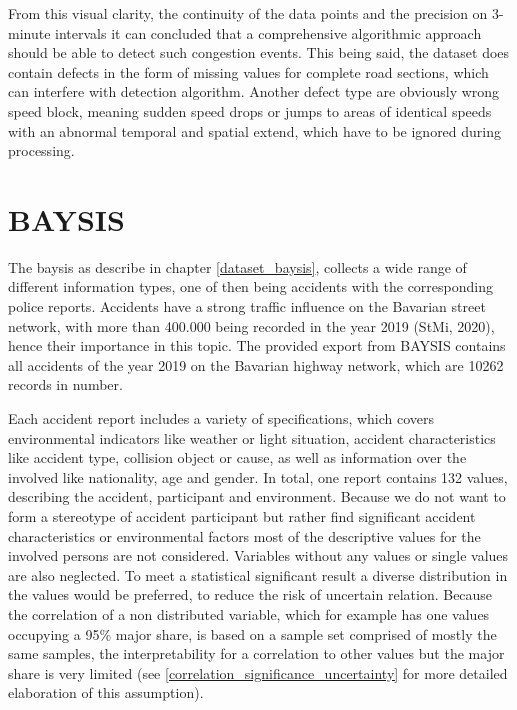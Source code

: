 From this visual clarity, the continuity of the data points and the precision on 3-minute intervals it can concluded that a comprehensive algorithmic approach should be able to detect such congestion events. This being said, the dataset does contain defects in the form of missing values for complete road sections, which can interfere with detection algorithm. Another defect type are obviously wrong speed block, meaning sudden speed drops or jumps to areas of identical speeds with an abnormal temporal and spatial extend, which have to be ignored during processing. 

\section{BAYSIS}
\label{dataset_baysis}

The \acrfull{baysis} as describe in chapter \autoref{dataset_baysis}, collects a wide range of different information types, one of then being accidents with the corresponding police reports. Accidents have a strong traffic influence on the Bavarian street network, with more than 400.000 being recorded in the year 2019 (StMi, 2020), hence their importance in this topic. The provided export from BAYSIS contains all accidents of the year 2019 on the Bavarian highway network, which are 10262 records in number. 

Each accident report includes a variety of specifications, which covers environmental indicators like weather or light situation, accident characteristics like accident type, collision object or cause, as well as information over the involved like nationality, age and gender. In total, one report contains 132 values, describing the accident, participant and environment. Because we do not want to form a stereotype of accident participant but rather find significant accident characteristics or environmental factors most of the descriptive values for the involved persons are not considered. Variables without any values or single values are also neglected. To meet a statistical significant result a diverse distribution in the values would be preferred, to reduce the risk of uncertain relation. Because the correlation of a non distributed variable, which for example has one values occupying a 95\% major share, is based on a sample set comprised of mostly the same samples, the interpretability for a correlation to other values but the major share is very limited (see \autoref{correlation_significance_uncertainty} for more detailed elaboration of this assumption).

